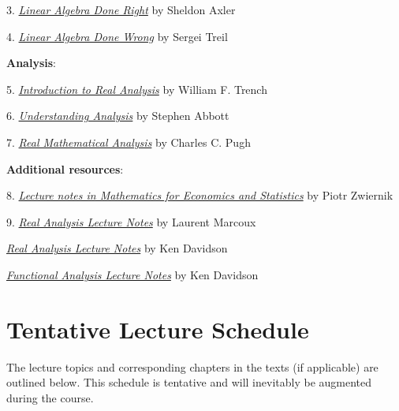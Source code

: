 \documentclass[12pt]{article}
\begin{document}
\vspace{0.1cm}

3. \href{https://link-springer-com.myaccess.library.utoronto.ca/book/10.1007/978-3-319-11080-6}{{\emph{Linear Algebra Done Right}}} by Sheldon Axler

4. \href{https://www.math.brown.edu/streil/papers/LADW/LADW.html}{{\emph{Linear Algebra Done Wrong}}} by Sergei Treil

\vspace{1em}

\noindent
{\bf{Analysis}}:
\vspace{0.1cm}

5. \href{https://digitalcommons.trinity.edu/mono/7/}{{\emph{Introduction to Real Analysis}}} by William F. Trench

6. \href{https://link-springer-com.myaccess.library.utoronto.ca/book/10.1007/978-1-4939-2712-8}{{\emph{Understanding Analysis}}} by Stephen Abbott

7. \href{https://link-springer-com.myaccess.library.utoronto.ca/book/10.1007/978-3-319-17771-7}{\emph{Real Mathematical Analysis}} by Charles C. Pugh


\vspace{1em}

\noindent
{\bf{Additional resources}}:
\vspace{0.1cm}

8. \href{http://84.89.132.1/~piotr/docs/RealAnalysisNotes.pdf}{\emph{Lecture notes in Mathematics for Economics and Statistics}} by Piotr Zwiernik

9. \href{http://www.math.uwaterloo.ca/~lwmarcou/notes/pmath351.pdf}{{\emph{Real Analysis Lecture Notes}}} by Laurent Marcoux

\href{http://www.math.uwaterloo.ca/~krdavids/PM351/PMath351Notes.pdf}{{\emph{Real Analysis Lecture Notes}}} by Ken Davidson

\href{http://www.math.uwaterloo.ca/~krdavids/FA/PM453Notes.pdf}{{\emph{Functional Analysis Lecture Notes}}} by Ken Davidson




\section{Tentative Lecture Schedule}
The lecture topics and corresponding chapters in the texts (if applicable) are outlined below.  This schedule is tentative and will inevitably be augmented during the course.  
\end{document}
